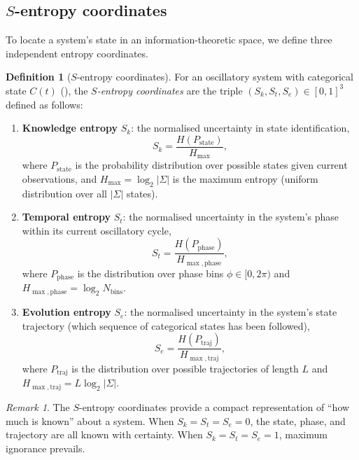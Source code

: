 \documentclass[twocolumn,10pt,a4paper]{article}
\theoremstyle{definition}
\newtheorem{definition}[theorem]{Definition}
\theoremstyle{remark}
\newtheorem{remark}[theorem]{Remark}
\begin{document}
\subsection{$S$-entropy coordinates}

To locate a system's state in an information-theoretic space, we define three independent entropy coordinates.

\begin{definition}[$S$-entropy coordinates]\label{def:s_entropy}
For an oscillatory system with categorical state $C(t)$ (), the \emph{$S$-entropy coordinates} are the triple $(S_k, S_t, S_e) \in [0,1]^3$ defined as follows:
\begin{enumerate}[label=(\roman*)]
\item \textbf{Knowledge entropy} $S_k$: the normalised uncertainty in state identification,
\begin{equation}\label{eq:S_k}
S_k = \frac{H(P_{\mathrm{state}})}{H_{\max}},
\end{equation}
where $P_{\mathrm{state}}$ is the probability distribution over possible states given current observations, and $H_{\max} = \log_2 |\Sigma|$ is the maximum entropy (uniform distribution over all $|\Sigma|$ states).

\item \textbf{Temporal entropy} $S_t$: the normalised uncertainty in the system's phase within its current oscillatory cycle,
\begin{equation}\label{eq:S_t}
S_t = \frac{H(P_{\mathrm{phase}})}{H_{\max,\mathrm{phase}}},
\end{equation}
where $P_{\mathrm{phase}}$ is the distribution over phase bins $\phi \in [0, 2\pi)$ and $H_{\max,\mathrm{phase}} = \log_2 N_{\mathrm{bins}}$.

\item \textbf{Evolution entropy} $S_e$: the normalised uncertainty in the system's state trajectory (which sequence of categorical states has been followed),
\begin{equation}\label{eq:S_e}
S_e = \frac{H(P_{\mathrm{traj}})}{H_{\max,\mathrm{traj}}},
\end{equation}
where $P_{\mathrm{traj}}$ is the distribution over possible trajectories of length $L$ and $H_{\max,\mathrm{traj}} = L \log_2 |\Sigma|$.
\end{enumerate}
\end{definition}

\begin{remark}
The $S$-entropy coordinates provide a compact representation of ``how much is known'' about a system. When $S_k = S_t = S_e = 0$, the state, phase, and trajectory are all known with certainty. When $S_k = S_t = S_e = 1$, maximum ignorance prevails.
\end{remark}
\end{document}
